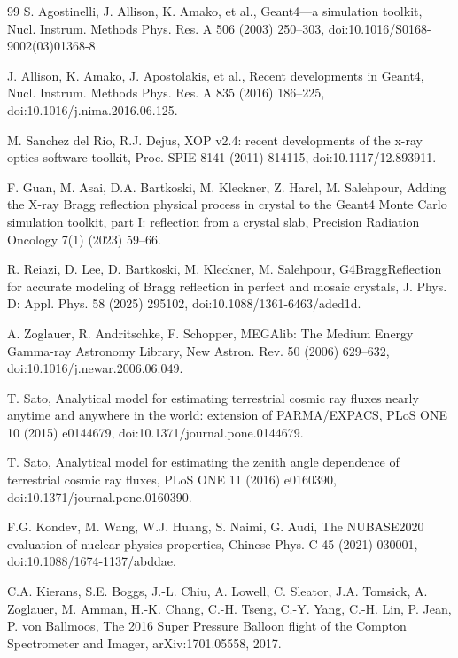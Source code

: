 \documentclass[11pt]{article}
\begin{document}
\begin{thebibliography}{99}
S. Agostinelli, J. Allison, K. Amako, et al., Geant4---a simulation toolkit, Nucl. Instrum. Methods Phys. Res. A 506 (2003) 250--303, doi:10.1016/S0168-9002(03)01368-8.

J. Allison, K. Amako, J. Apostolakis, et al., Recent developments in Geant4, Nucl. Instrum. Methods Phys. Res. A 835 (2016) 186--225, doi:10.1016/j.nima.2016.06.125.

M. Sanchez del Rio, R.J. Dejus, XOP v2.4: recent developments of the x-ray optics software toolkit, Proc. SPIE 8141 (2011) 814115, doi:10.1117/12.893911.

F. Guan, M. Asai, D.A. Bartkoski, M. Kleckner, Z. Harel, M. Salehpour, Adding the X-ray Bragg reflection physical process in crystal to the Geant4 Monte Carlo simulation toolkit, part I: reflection from a crystal slab, Precision Radiation Oncology 7(1) (2023) 59--66.

R. Reiazi, D. Lee, D. Bartkoski, M. Kleckner, M. Salehpour, G4BraggReflection for accurate modeling of Bragg reflection in perfect and mosaic crystals, J. Phys. D: Appl. Phys. 58 (2025) 295102, doi:10.1088/1361-6463/aded1d.

A. Zoglauer, R. Andritschke, F. Schopper, MEGAlib: The Medium Energy Gamma-ray Astronomy Library, New Astron. Rev. 50 (2006) 629--632, doi:10.1016/j.newar.2006.06.049.

T. Sato, Analytical model for estimating terrestrial cosmic ray fluxes nearly anytime and anywhere in the world: extension of PARMA/EXPACS, PLoS ONE 10 (2015) e0144679, doi:10.1371/journal.pone.0144679.

T. Sato, Analytical model for estimating the zenith angle dependence of terrestrial cosmic ray fluxes, PLoS ONE 11 (2016) e0160390, doi:10.1371/journal.pone.0160390.

F.G. Kondev, M. Wang, W.J. Huang, S. Naimi, G. Audi, The NUBASE2020 evaluation of nuclear physics properties, Chinese Phys. C 45 (2021) 030001, doi:10.1088/1674-1137/abddae.

C.A. Kierans, S.E. Boggs, J.-L. Chiu, A. Lowell, C. Sleator, J.A. Tomsick, A. Zoglauer, M. Amman, H.-K. Chang, C.-H. Tseng, C.-Y. Yang, C.-H. Lin, P. Jean, P. von Ballmoos, The 2016 Super Pressure Balloon flight of the Compton Spectrometer and Imager, arXiv:1701.05558, 2017.


\end{thebibliography}
\end{document}
